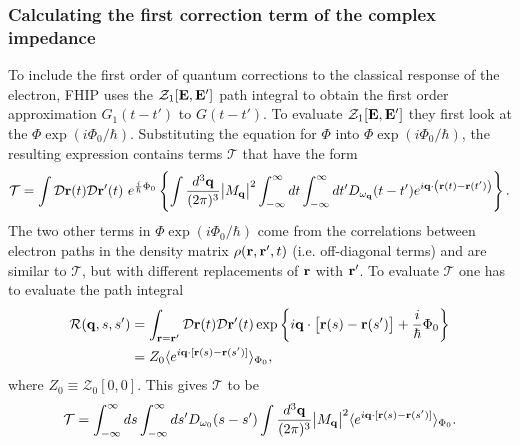 \subsubsection{Calculating the first correction term of the complex impedance}
\label{subsubsec:2-3-1-3}

To include the first order of quantum corrections to the classical response of the electron, FHIP uses the $\mathcal{Z}_1[\vb{E}, \vb{E}']$ path integral to obtain the first order approximation $G_1(t-t')$ to $G(t-t')$. To evaluate $\mathcal{Z}_1[\vb{E}, \vb{E}']$ they first look at the $\Phi \exp(i \Phi_0 / \hbar)$. Substituting the equation for $\Phi$ into $\Phi \exp(i \Phi_0 / \hbar)$, the resulting expression contains terms $\mathcal{T}$ that have the form
\begin{equation}
    \mathcal{T} = \int \mathcal{D}\vb{r}(t) \mathcal{D}\vb{r}'(t)\ e^{\frac{i}{\hbar} \Phi_0} \left\{ \int \frac{d^3\vb{q}}{(2\pi)^3} \abs{M_{\vb{q}}}^2 \int^\infty_{-\infty} dt \int^\infty_{-\infty} dt' D_{\omega_{\vb{q}}}(t-t') e^{i\vb{q}\cdot\left(\vb{r}(t) - \vb{r}(t')\right)} \right\}.
\end{equation}
The two other terms in $\Phi \exp(i \Phi_0 / \hbar)$ come from the correlations between electron paths in the density matrix $\rho(\vb{r}, \vb{r}', t)$ (i.e. off-diagonal terms) and are similar to $\mathcal{T}$, but with different replacements of $\vb{r}$ with $\vb{r}'$. To evaluate $\mathcal{T}$ one has to evaluate the path integral
\begin{equation}
    \begin{aligned}
    \mathcal{R}(\vb{q}, s, s') &= \int_{\vb{r} = \vb{r}'} \mathcal{D}\vb{r}(t) \mathcal{D}\vb{r}'(t) \exp\left\{ i \vb{q} \cdot \left[ \vb{r}(s) - \vb{r}(s') \right] + \frac{i}{\hbar} \Phi_0 \right\} \\
    &= Z_0 \langle e^{i \vb{q} \cdot [\vb{r}(s) - \vb{r}(s')]}  \rangle_{\Phi_0},
    \end{aligned}
\end{equation}
where $Z_0 \equiv \mathcal{Z}_0[0, 0]$. This gives $\mathcal{T}$ to be
\begin{equation}\label{eqn:fhip_genfun}
    \begin{gathered}
        \mathcal{T} = \int^\infty_{-\infty} ds \int^\infty_{-\infty} ds' D_{\omega_0}(s-s') \int \frac{d^3\vb{q}}{(2\pi)^3} \abs{M_{\vb{q}}}^2 \langle  e^{i \vb{q} \cdot [\vb{r}(s) - \vb{r}(s')]} \rangle_{\Phi_0}.
    \end{gathered}
\end{equation} 
